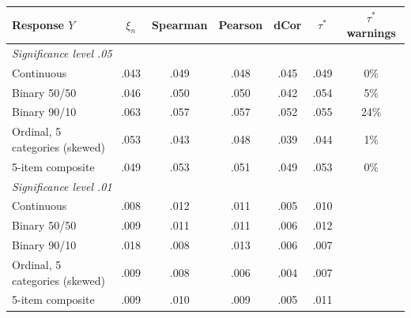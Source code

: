 \begin{tabular}{lcccccc}
\toprule
Response $Y$ & $\xi_n$ & Spearman & Pearson & dCor & $\tau^*$ & $\tau^*$ warnings \\
\midrule
\multicolumn{7}{l}{\emph{Significance level .05}} \\
Continuous & .043 & .049 & .048 & .045 & .049 & 0\% \\
Binary 50/50 & .046 & .050 & .050 & .042 & .054 & 5\% \\
Binary 90/10 & .063 & .057 & .057 & .052 & .055 & 24\% \\
Ordinal, 5 categories (skewed) & .053 & .043 & .048 & .039 & .044 & 1\% \\
5-item composite & .049 & .053 & .051 & .049 & .053 & 0\% \\
\midrule
\multicolumn{7}{l}{\emph{Significance level .01}} \\
Continuous & .008 & .012 & .011 & .005 & .010 &  \\
Binary 50/50 & .009 & .011 & .011 & .006 & .012 &  \\
Binary 90/10 & .018 & .008 & .013 & .006 & .007 &  \\
Ordinal, 5 categories (skewed) & .009 & .008 & .006 & .004 & .007 &  \\
5-item composite & .009 & .010 & .009 & .005 & .011 &  \\
\bottomrule
\end{tabular}
